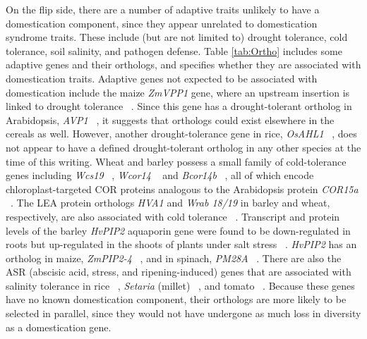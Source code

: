 \documentclass[12pt]{article}
\begin{document}
On the flip side, there are a number of adaptive traits unlikely to have a domestication component, since they appear unrelated to domestication syndrome traits.
These include (but are not limited to) drought tolerance, cold tolerance, soil salinity, and pathogen defense.
Table \ref{tab:Ortho} includes some adaptive genes and their orthologs, and specifies whether they are associated with domestication traits.
Adaptive genes not expected to be associated with domestication include the maize \textit{ZmVPP1} gene, where an upstream insertion is linked to drought tolerance ~\citep{Wang2016}.
Since this gene has a drought-tolerant ortholog in Arabidopsis, \textit{AVP1} ~\citep{Gaxiola2001}, it suggests that orthologs could exist elsewhere in the cereals as well.
However, another drought-tolerance gene in rice, \textit{OsAHL1} ~\citep{Zhou2016}, does not appear to have a defined drought-tolerant ortholog in any other species at the time of this writing.
Wheat and barley possess a small family of cold-tolerance genes including \textit{Wcs19} ~\citep{pmid8219063}, \textit{Wcor14} ~\citep{pmid10846621} and \textit{Bcor14b} ~\citep{pmid9952464}, all of which encode chloroplast-targeted COR proteins analogous to the Arabidopsis protein \textit{COR15a}  ~\citep{pmid9826741, Takumi2003}.
The LEA protein orthologs \textit{HVA1} and \textit{Wrab 18/19} in barley and wheat, respectively, are also associated with cold tolerance ~\citep{Hong1988, pmid16755132}.
Transcript and protein levels of the barley \textit{HvPIP2} aquaporin gene were found to be down-regulated in roots but up-regulated in the shoots of plants under salt stress ~\citep{Katsuhara2002}.
\textit{HvPIP2} has an ortholog in maize, \textit{ZmPIP2-4} ~\citep{Zhu2005}, and in spinach, \textit{PM28A} ~\citep{Fotiadis2000}.
There are also the ASR (abscisic acid, stress, and ripening-induced) genes that are associated with salinity tolerance in rice ~\citep{Joo2013}, \textit{Setaria} (millet) ~\citep{Li2017}, and tomato ~\citep{Konrad2008}.  
Because these genes have no known domestication component, their orthologs are more likely to be selected in parallel, since they would not have undergone as much loss in diversity as a domestication gene. 
\end{document}
